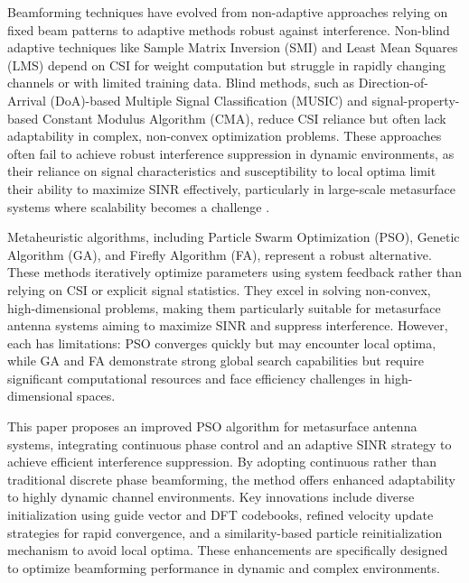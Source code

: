 \documentclass[lettersize,journal]{IEEEtran}
\begin{document}
Beamforming techniques have evolved from non-adaptive approaches relying on fixed beam patterns to adaptive methods robust against interference\cite{van_veen_beamforming_1988}. Non-blind adaptive techniques like Sample Matrix Inversion (SMI) and Least Mean Squares (LMS) depend on CSI for weight computation but struggle in rapidly changing channels or with limited training data\cite{ali_beamforming_2017}. Blind methods, such as Direction-of-Arrival (DoA)-based Multiple Signal Classification (MUSIC) \cite{jaafer_best_2018} and signal-property-based Constant Modulus Algorithm (CMA)\cite{zhao_semi-blind_2017}, reduce CSI reliance but often lack adaptability in complex, non-convex optimization problems. These approaches often fail to achieve robust interference suppression in dynamic environments, as their reliance on signal characteristics and susceptibility to local optima limit their ability to maximize SINR effectively, particularly in large-scale metasurface systems where scalability becomes a challenge \cite{almagboul_efficient_2019}.

Metaheuristic algorithms, including Particle Swarm Optimization (PSO)\cite{huang_adaptive_2016}, Genetic Algorithm (GA)\cite{gaydos_adaptive_2019}, and Firefly Algorithm (FA)\cite{le_generalized_2024}, represent a robust alternative. These methods iteratively optimize parameters using system feedback rather than relying on CSI or explicit signal statistics. They excel in solving non-convex, high-dimensional problems, making them particularly suitable for metasurface antenna systems aiming to maximize SINR and suppress interference. However, each has limitations: PSO converges quickly but may encounter local optima, while GA and FA demonstrate strong global search capabilities but require significant computational resources and face efficiency challenges in high-dimensional spaces\cite{tang_multi-strategy_2015}\cite{hoang_firefly_2024}.

This paper proposes an improved PSO algorithm for metasurface antenna systems, integrating continuous phase control and an adaptive SINR strategy to achieve efficient interference suppression. By adopting continuous rather than traditional discrete phase beamforming, the method offers enhanced adaptability to highly dynamic channel environments. Key innovations include diverse initialization using guide vector and DFT codebooks, refined velocity update strategies for rapid convergence, and a similarity-based particle reinitialization mechanism to avoid local optima. These enhancements are specifically designed to optimize beamforming performance in dynamic and complex environments.
\end{document}
